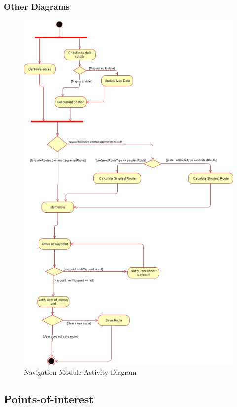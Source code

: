 \documentclass{article}
\begin{document}
        \subsubsection{Other Diagrams}
        \begin{figure}[!h]
        	\includegraphics[width=\textwidth]{Navigation_Activity_Diagram}
        	\caption{Navigation Module Activity Diagram}
        \end{figure}
    \subsection{Points-of-interest}
    
\end{document}
